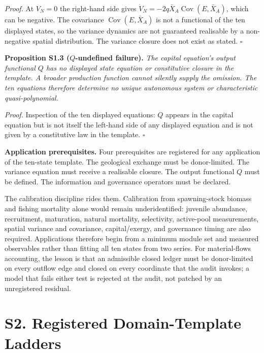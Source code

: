 \documentclass[11pt]{article}
\begin{document}
\emph{Proof.} At \(V_N = 0\) the right-hand side gives \(\dot V_N = -2q\bar X_A \operatorname{Cov}(E, \bar X_A)\), which can be negative. The covariance \(\operatorname{Cov}(E, \bar X_A)\) is not a functional of the ten displayed states, so the variance dynamics are not guaranteed realisable by a non-negative spatial distribution. The variance closure does not exist as stated. \(\square\)

\textbf{Proposition S1.3 (\(Q\)-undefined failure).} \emph{The capital equation's output functional \(Q\) has no displayed state equation or constitutive closure in the template. A broader production function cannot silently supply the omission. The ten equations therefore determine no unique autonomous system or characteristic quasi-polynomial.}

\emph{Proof.} Inspection of the ten displayed equations: \(Q\) appears in the capital equation but is not itself the left-hand side of any displayed equation and is not given by a constitutive law in the template. \(\square\)

\textbf{Application prerequisites.} Four prerequisites are registered for any application of the ten-state template. The geological exchange must be donor-limited. The variance equation must receive a realisable closure. The output functional \(Q\) must be defined. The information and governance operators must be declared.

The calibration discipline rides them. Calibration from spawning-stock biomass and fishing mortality alone would remain underidentified: juvenile abundance, recruitment, maturation, natural mortality, selectivity, active-pool measurements, spatial variance and covariance, capital/\allowbreak{}exergy, and governance timing are also required. Applications therefore begin from a minimum module set and measured observables rather than fitting all ten states from two series. For material-flows accounting, the lesson is that an admissible closed ledger must be donor-limited on every outflow edge and closed on every coordinate that the audit invokes; a model that fails either test is rejected at the audit, not patched by an unregistered residual.

\vspace{0.8em}

\section*{S2. Registered Domain-Template Ladders}\label{s2-registered-domain-template-ladders}
\end{document}
